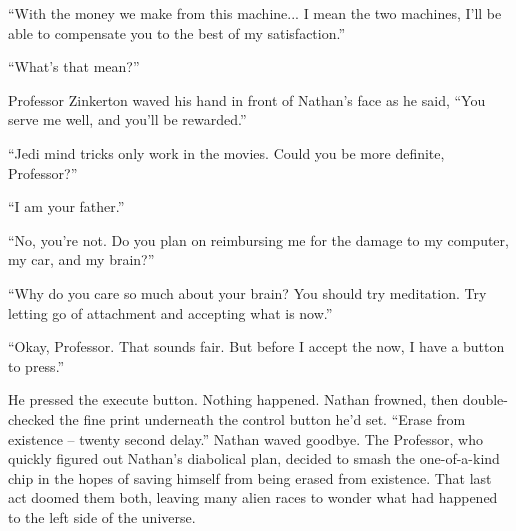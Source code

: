 “With the money we make from this machine... I mean the two machines, I'll be able to compensate you to the best of my satisfaction.”

“What's that mean?”

Professor Zinkerton waved his hand in front of Nathan's face as he said, “You serve me well, and you'll be rewarded.”

“Jedi mind tricks only work in the movies. Could you be more definite, Professor?”

“I am your father.”

“No, you're not. Do you plan on reimbursing me for the damage to my computer, my car, and my brain?”

“Why do you care so much about your brain? You should try meditation. Try letting go of attachment and accepting what is now.”

“Okay, Professor. That sounds fair. But before I accept the now, I have a button to press.”

He pressed the execute button. Nothing happened. Nathan frowned, then double-checked the fine print underneath the control button he'd set. “Erase from existence – twenty second delay.” Nathan waved goodbye. The Professor, who quickly figured out Nathan's diabolical plan, decided to smash the one-of-a-kind chip in the hopes of saving himself from being erased from existence. That last act doomed them both, leaving many alien races to wonder what had happened to the left side of the universe.